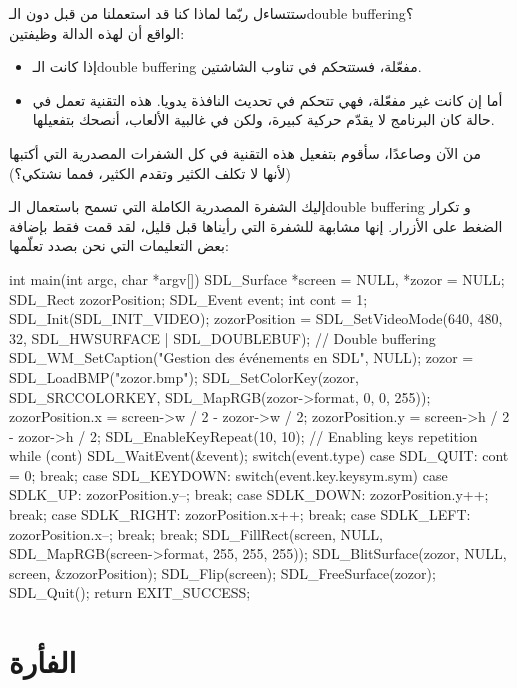 ستتساءل ربّما لماذا كنا قد استعملنا
من قبل دون الـ\textenglish{double buffering}؟\\
الواقع أن لهذه الدالة وظيفتين:

\begin{itemize}
	\item إذا كانت الـ\textenglish{double buffering}
	مفعّلة، فستتحكم في تناوب الشاشتين.
	\item أما إن كانت غير مفعّلة، فهي تتحكم في تحديث النافذة يدويا. هذه التقنية تعمل في حالة كان البرنامج لا يقدّم حركية كبيرة، ولكن في غالبية الألعاب، أنصحك بتفعيلها.
\end{itemize}

من الآن وصاعدًا، سأقوم بتفعيل هذه التقنية في كل الشفرات المصدرية التي أكتبها (لأنها لا تكلف الكثير وتقدم الكثير، فمما نشتكي؟)

إليك الشفرة المصدرية الكاملة التي تسمح باستعمال الـ\textenglish{double buffering}
و تكرار الضغط على الأزرار. إنها مشابهة للشفرة التي رأيناها قبل قليل، لقد قمت فقط بإضافة بعض التعليمات التي نحن بصدد تعلّمها:

\begin{Csource}
int main(int argc, char *argv[])
{
	SDL_Surface *screen = NULL, *zozor = NULL;
	SDL_Rect zozorPosition;
	SDL_Event event;
	int cont = 1;
	SDL_Init(SDL_INIT_VIDEO);
	zozorPosition = SDL_SetVideoMode(640, 480, 32, SDL_HWSURFACE | SDL_DOUBLEBUF); // Double buffering
	SDL_WM_SetCaption("Gestion des événements en SDL", NULL);
	zozor = SDL_LoadBMP("zozor.bmp");
	SDL_SetColorKey(zozor, SDL_SRCCOLORKEY, SDL_MapRGB(zozor->format, 0, 0, 255));
	zozorPosition.x = screen->w / 2 - zozor->w / 2;
	zozorPosition.y = screen->h / 2 - zozor->h / 2;
	SDL_EnableKeyRepeat(10, 10); // Enabling keys repetition
	while (cont)
	{
		SDL_WaitEvent(&event);
		switch(event.type)
		{
			case SDL_QUIT:
			cont = 0;
			break;
			case SDL_KEYDOWN:
			switch(event.key.keysym.sym)
			{
				case SDLK_UP:
				zozorPosition.y--;
				break;
				case SDLK_DOWN:
				zozorPosition.y++;
				break;
				case SDLK_RIGHT:
				zozorPosition.x++;
				break;
				case SDLK_LEFT:
				zozorPosition.x--;
				break;
			}
			break;
		}
		SDL_FillRect(screen, NULL, SDL_MapRGB(screen->format, 255, 255, 255));
		SDL_BlitSurface(zozor, NULL, screen, &zozorPosition);
		SDL_Flip(screen);
	}
	SDL_FreeSurface(zozor);
	SDL_Quit();
	return EXIT_SUCCESS;
}
\end{Csource}

\section{الفأرة}

